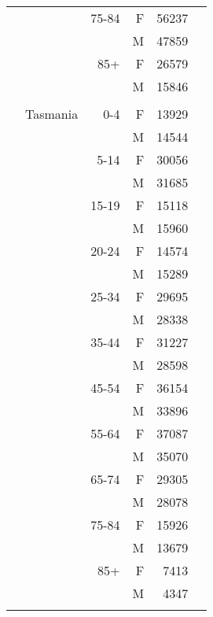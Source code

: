 \begin{tabular}{@{}c@{}rrrr@{}c@{}}
\phantom{.} &                                &  75-84 &  F &   56237 &\tabularnewline\relax 
\phantom{.} &                                &        &  M &   47859 &\tabularnewline\relax 
\phantom{.} &                                &    85+ &  F &   26579 &\tabularnewline\relax 
\phantom{.} &                                &        &  M &   15846 &\tabularnewline\relax 
\phantom{.} &            &            &            &            &\tabularnewline[0.5\baselineskip]
\phantom{.} &                       Tasmania &    0-4 &  F &   13929 &\tabularnewline\relax 
\phantom{.} &                                &        &  M &   14544 &\tabularnewline\relax 
\phantom{.} &                                &   5-14 &  F &   30056 &\tabularnewline\relax 
\phantom{.} &                                &        &  M &   31685 &\tabularnewline\relax 
\phantom{.} &                                &  15-19 &  F &   15118 &\tabularnewline\relax 
\phantom{.} &                                &        &  M &   15960 &\tabularnewline\relax 
\phantom{.} &                                &  20-24 &  F &   14574 &\tabularnewline\relax 
\phantom{.} &                                &        &  M &   15289 &\tabularnewline\relax 
\phantom{.} &                                &  25-34 &  F &   29695 &\tabularnewline\relax 
\phantom{.} &                                &        &  M &   28338 &\tabularnewline\relax 
\phantom{.} &                                &  35-44 &  F &   31227 &\tabularnewline\relax 
\phantom{.} &                                &        &  M &   28598 &\tabularnewline\relax 
\phantom{.} &                                &  45-54 &  F &   36154 &\tabularnewline\relax 
\phantom{.} &                                &        &  M &   33896 &\tabularnewline\relax 
\phantom{.} &                                &  55-64 &  F &   37087 &\tabularnewline\relax 
\phantom{.} &                                &        &  M &   35070 &\tabularnewline\relax 
\phantom{.} &                                &  65-74 &  F &   29305 &\tabularnewline\relax 
\phantom{.} &                                &        &  M &   28078 &\tabularnewline\relax 
\phantom{.} &                                &  75-84 &  F &   15926 &\tabularnewline\relax 
\phantom{.} &                                &        &  M &   13679 &\tabularnewline\relax 
\phantom{.} &                                &    85+ &  F &    7413 &\tabularnewline\relax 
\phantom{.} &                                &        &  M &    4347 &\tabularnewline\relax 
\phantom{.} &            &            &            &            &\tabularnewline[0.5\baselineskip]

\end{tabular}
